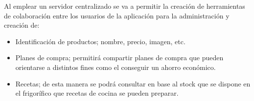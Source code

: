 \begin{description}
    Al emplear un servidor centralizado se va a permitir la creación de herramientas de colaboración entre los usuarios de la aplicación para la administración y creación de:
        \begin{itemize}
        \item Identificación de productos; nombre, precio, imagen, etc.
        \item Planes de compra; permitirá compartir planes de compra que pueden orientarse a distintos fines como el conseguir un ahorro económico.
        \item Recetas; de esta manera se podrá consultar en base al stock que se dispone en el frigorífico que recetas de cocina se pueden preparar.
        \end{itemize}
\end{description}